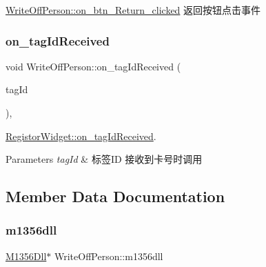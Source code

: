 \mbox{\hyperlink{class_write_off_person_ab1256ef9bad90ead6cbe0f925adf05f7}{Write\+Off\+Person\+::on\+\_\+btn\+\_\+\+Return\+\_\+clicked}} 返回按钮点击事件 

\mbox{\label{class_write_off_person_a5c38bb89e0bb35cc0123d04b9c076260}} 
\subsubsection{\texorpdfstring{on\_tagIdReceived}{on\_tagIdReceived}}
{\footnotesize\ttfamily void Write\+Off\+Person\+::on\+\_\+tag\+Id\+Received (\begin{DoxyParamCaption}\item[{Q\+String}]{tag\+Id }\end{DoxyParamCaption})\hspace{0.3cm}{\ttfamily [private]}, {\ttfamily [slot]}}



\mbox{\hyperlink{class_registor_widget_a7f2af14f69efa2bdc0d57f9957cc1dc1}{Registor\+Widget\+::on\+\_\+tag\+Id\+Received}}. 


\begin{DoxyParams}{Parameters}
{\em tag\+Id} & 标签\+ID 接收到卡号时调用 \\
\hline
\end{DoxyParams}


\subsection{Member Data Documentation}
\mbox{\label{class_write_off_person_acf0c00685b05bdb134d2dbf715ea041b}} 
\subsubsection{\texorpdfstring{m1356dll}{m1356dll}}
{\footnotesize\ttfamily \mbox{\hyperlink{class_m1356_dll}{M1356\+Dll}}$\ast$ Write\+Off\+Person\+::m1356dll\hspace{0.3cm}{\ttfamily [private]}}

\mbox{\label{class_write_off_person_ac1a66c10d4db76eaf05c2aedff8b26e9}} 
